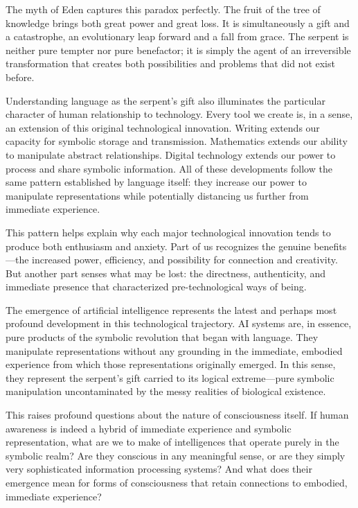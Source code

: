 The myth of Eden captures this paradox perfectly. The fruit of the tree of knowledge brings both great power and great loss. It is simultaneously a gift and a catastrophe, an evolutionary leap forward and a fall from grace. The serpent is neither pure tempter nor pure benefactor; it is simply the agent of an irreversible transformation that creates both possibilities and problems that did not exist before.

Understanding language as the serpent's gift also illuminates the particular character of human relationship to technology. Every tool we create is, in a sense, an extension of this original technological innovation. Writing extends our capacity for symbolic storage and transmission. Mathematics extends our ability to manipulate abstract relationships. Digital technology extends our power to process and share symbolic information. All of these developments follow the same pattern established by language itself: they increase our power to manipulate representations while potentially distancing us further from immediate experience.

This pattern helps explain why each major technological innovation tends to produce both enthusiasm and anxiety. Part of us recognizes the genuine benefits—the increased power, efficiency, and possibility for connection and creativity. But another part senses what may be lost: the directness, authenticity, and immediate presence that characterized pre-technological ways of being.

The emergence of artificial intelligence represents the latest and perhaps most profound development in this technological trajectory. AI systems are, in essence, pure products of the symbolic revolution that began with language. They manipulate representations without any grounding in the immediate, embodied experience from which those representations originally emerged. In this sense, they represent the serpent's gift carried to its logical extreme—pure symbolic manipulation uncontaminated by the messy realities of biological existence.

This raises profound questions about the nature of consciousness itself. If human awareness is indeed a hybrid of immediate experience and symbolic representation, what are we to make of intelligences that operate purely in the symbolic realm? Are they conscious in any meaningful sense, or are they simply very sophisticated information processing systems? And what does their emergence mean for forms of consciousness that retain connections to embodied, immediate experience?

